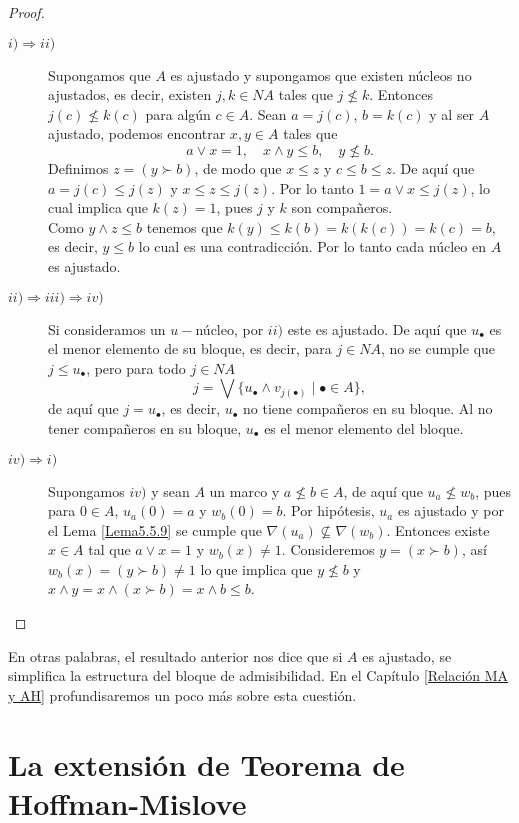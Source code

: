 \begin{proof}
    \begin{description}
        \item[$i)\Rightarrow ii) $] Supongamos que $A$ es ajustado y supongamos que existen núcleos no ajustados, es decir, existen $j, k\in NA$ tales que $j\nleq k$. Entonces $j(c)\nleq k(c)$ para algún $c\in A$. Sean $a=j(c)$, $b=k(c)$ y al ser $A$ ajustado, podemos encontrar $x, y\in A$ tales que 
        \[
        a\vee x=1,\quad x\wedge y\leq b, \quad y\nleq b.
        \]
        Definimos $z=(y\succ b)$, de modo que $x\leq z$ y $c\leq b\leq z$. De aquí que $a=j(c)\leq j(z)$ y $x\leq z\leq j(z)$. Por lo tanto $1=a\vee x\leq j(z)$, lo cual implica que $k(z)=1$, pues $j$ y $k$ son compañeros.\\

        Como $y\wedge z\leq b$ tenemos que $k(y)\leq k(b)=k(k(c))=k(c)=b$, es decir, $y\leq b$ lo cual es una contradicción. Por lo tanto cada núcleo en $A$ es ajustado.

        \item[$ii)\Rightarrow iii)\Rightarrow iv) $] Si consideramos un $u-$núcleo, por $ii)$ este es ajustado. De aquí que $u_\bullet$ es el menor elemento de su bloque, es decir, para $j\in NA$, no se cumple que $j\leq u_\bullet$, pero para todo $j\in NA$
        \[
        j=\bigvee\{u_\bullet\wedge v_{j(\bullet)}\mid \bullet \in A\},
        \]
        de aquí que $j=u_\bullet$, es decir, $u_\bullet$ no tiene compañeros en su bloque. Al no tener compañeros en su bloque, $u_\bullet$ es el menor elemento del bloque.

        \item[$iv)\Rightarrow i) $] Supongamos $iv)$ y sean $A$ un marco y $a\nleq b\in A$, de aquí que $u_a\nleq w_b$, pues para $0\in A$, $u_a(0)=a$ y $w_b(0)=b$. Por hipótesis, $u_a$ es ajustado y por el Lema \ref{Lema5.5.9} se cumple que $\nabla(u_a)\nsubseteq \nabla(w_b)$. Entonces existe $x\in A$ tal que $a\vee x=1$ y $w_b(x)\neq 1$. Consideremos $y=(x\succ b)$, así $w_b(x)=(y\succ b)\neq 1$ lo que implica que $y\nleq b$ y $x\wedge y=x\wedge (x\succ b)=x\wedge b\leq b$.
    \end{description}
\end{proof}

En otras palabras, el resultado anterior nos dice que si $A$ es ajustado, se simplifica la estructura del bloque de admisibilidad. En el Capítulo \ref{Relación MA y AH} profundisaremos un poco más sobre esta cuestión.

\section{La extensión de Teorema de Hoffman-Mislove}

